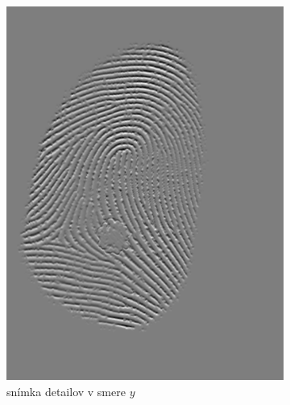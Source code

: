 \begin{figure}[h]
\begin{subfigure}[b]{0.3\linewidth}
      \includegraphics[width=\linewidth]{obrazky-figures/dY.png}
      \caption{snímka detailov v smere $y$}
    \end{subfigure}
    \hfill
    \begin{subfigure}[b]{0.3\linewidth}

\end{subfigure}
\end{figure}
